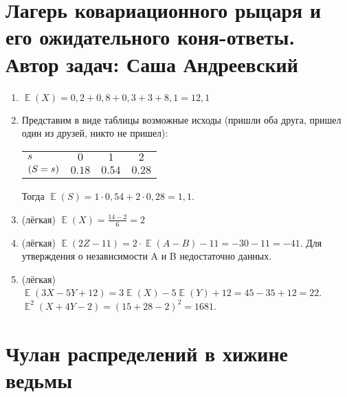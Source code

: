 \documentclass[a4paper,12pt]{article}
\DeclareMathOperator{\E}{\mathbb{E}}
\let\P\relax
\DeclareMathOperator{\P}{\mathbb{P}}
\begin{document}
\newpage
\section{Лагерь ковариационного рыцаря и его ожидательного коня-ответы. Автор задач: Саша Андреевский}

\begin{enumerate}
\item $\E(X)=0,2+0,8+0,3+3+8,1=12,1$
\item Представим в виде таблицы возможные исходы (пришли оба друга, пришел один из друзей, никто не пришел):

\begin{center}\begin{tabular}{lccc}
\toprule
 $s$     & $0$  & $1$   & $2$ \\
$\P(S=s)$ & $0.18$ & $0.54$ & $0.28$\\
\bottomrule
\end{tabular}\end{center}

Тогда $\E(S)={1}\cdot{0,54}+{2}\cdot{0,28}=1,1$.
\item (лёгкая) $\E(X)=\frac{14-2}{6}=2$
\item (лёгкая) $\E(2Z-11)={2}\cdot{\E(A-B)}-11=-30-11=-41$. Для утверждения о независимости A и B недостаточно данных.
\item (лёгкая) $\E(3X-5Y+12)=3\E(X)-5\E(Y)+12=45-35+12=22$. $\E^2(X+4Y-2)=(15+28-2)^2=1681$.
\end{enumerate}





\newpage
\section{Чулан распределений в хижине ведьмы} %
\end{document}
